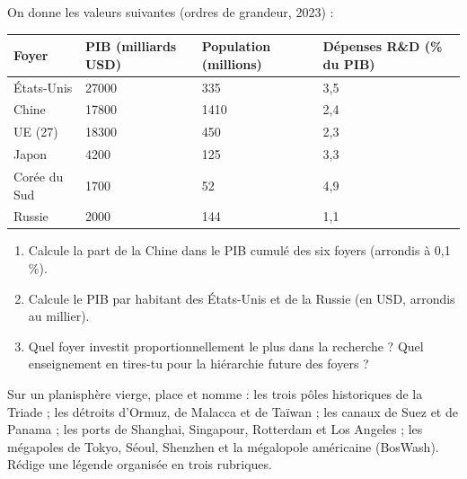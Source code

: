 \documentclass[11pt]{article}
\newcounter{popsec}
\newcounter{popsub}
\newcommand{\courssub}[1]{%
  \stepcounter{popsub}%
  \par\vspace{9pt}\noindent{\popxbold\fontsize{11.5}{13}\selectfont\color{popink}{\color{poporange}\thepopsec.\thepopsub}\hspace{6pt}#1}\par\nopagebreak\vspace{4pt}
}
\begin{document}
\begin{exercice}
On donne les valeurs suivantes (ordres de grandeur, 2023) :
\begin{center}
\begin{tabularx}{\linewidth}{|l|X|X|X|}
\hline
\rowcolor{popblueL} \textbf{Foyer} & \textbf{PIB (milliards USD)} & \textbf{Population (millions)} & \textbf{Dépenses R\&D (\% du PIB)} \\
\hline
États-Unis & \num{27000} & 335 & 3,5 \\
\hline
Chine & \num{17800} & \num{1410} & 2,4 \\
\hline
UE (27) & \num{18300} & 450 & 2,3 \\
\hline
Japon & \num{4200} & 125 & 3,3 \\
\hline
Corée du Sud & \num{1700} & 52 & 4,9 \\
\hline
Russie & \num{2000} & 144 & 1,1 \\
\hline
\end{tabularx}
\end{center}
\begin{enumerate}
\item Calcule la part de la Chine dans le PIB cumulé des six foyers (arrondis à 0,1 \%).
\item Calcule le PIB par habitant des États-Unis et de la Russie (en USD, arrondis au millier).
\item Quel foyer investit proportionnellement le plus dans la recherche ? Quel enseignement en tires-tu pour la hiérarchie future des foyers ?
\end{enumerate}
\end{exercice}

\courssub{Je m'entraîne}

\begin{exercice}
Sur un planisphère vierge, place et nomme : les trois pôles historiques de la Triade ; les détroits d'Ormuz, de Malacca et de Taïwan ; les canaux de Suez et de Panama ; les ports de Shanghai, Singapour, Rotterdam et Los Angeles ; les mégapoles de Tokyo, Séoul, Shenzhen et la mégalopole américaine (BosWash). Rédige une légende organisée en trois rubriques.
\end{exercice}
\end{document}
